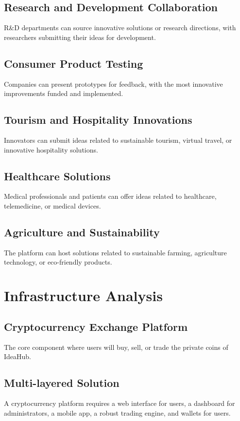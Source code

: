 \documentclass{article}
\begin{document}
	\subsection{Research and Development Collaboration}
	R\&D departments can source innovative solutions or research directions, with researchers submitting their ideas for development.
	
	\subsection{Consumer Product Testing}
	Companies can present prototypes for feedback, with the most innovative improvements funded and implemented.
	
	\subsection{Tourism and Hospitality Innovations}
	Innovators can submit ideas related to sustainable tourism, virtual travel, or innovative hospitality solutions.
	
	\subsection{Healthcare Solutions}
	Medical professionals and patients can offer ideas related to healthcare, telemedicine, or medical devices.
	
	\subsection{Agriculture and Sustainability}
	The platform can host solutions related to sustainable farming, agriculture technology, or eco-friendly products.
	
	\section{Infrastructure Analysis}
	\subsection{Cryptocurrency Exchange Platform}
	The core component where users will buy, sell, or trade the private coins of IdeaHub.
	
	\subsection{Multi-layered Solution}
	A cryptocurrency platform requires a web interface for users, a dashboard for administrators, a mobile app, a robust trading engine, and wallets for users.
	
\end{document}
